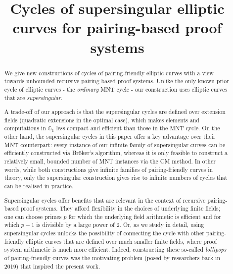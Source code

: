 \documentclass[version=preprint]{iacrcc}
\newcommand{\G}{\mathbb{G}}
\begin{document}
\title[running = {Cycles of supersingular elliptic curves for pairing-based proof systems},
]{Cycles of supersingular elliptic curves for pairing-based proof systems}




\maketitle


\begin{abstract}
We give new constructions of cycles of pairing-friendly elliptic curves with a view towards unbounded recursive pairing-based proof systems. Unlike the only known prior cycle of elliptic curves - the \emph{ordinary} MNT cycle - our construction uses elliptic curves that are \emph{supersingular}. 

A trade-off of our approach is that the supersingular cycles are defined over extension fields (quadratic extensions in the optimal case), which makes elements and computations in $\G_1$ less compact and efficient than those in the MNT cycle. On the other hand, the supersingular cycles in this paper offer a key advantage over their MNT counterpart: every instance of our infinite family of supersingular curves can be efficiently constructed via Br{\"o}ker's algorithm, whereas it is only feasible to construct a relatively small, bounded number of MNT instances via the CM method. In other words, while both constructions give infinite families of pairing-friendly curves in theory, only the supersingular construction gives rise to infinite numbers of cycles that can be realised in practice. 

Supersingular cycles offer benefits that are relevant in the context of recursive pairing-based proof systems. They afford flexibility in the choices of underlying finite fields; one can choose primes $p$ for which the underlying field arithmetic is efficient and for which $p-1$ is divisible by a large power of 2. Or, as we study in detail, using supersingular cycles unlocks the possibility of connecting the cycle with other pairing-friendly elliptic curves that are defined over much smaller finite fields, where proof system arithmetic is much more efficient. Indeed, constructing these so-called \emph{lollipops} of pairing-friendly curves was the motivating problem (posed by researchers back in 2019) that inspired the present work. 
\end{abstract}
\end{document}
